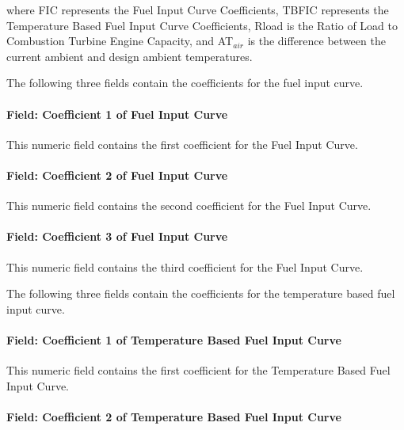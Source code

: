 where FIC represents the Fuel Input Curve Coefficients, TBFIC represents the Temperature Based Fuel Input Curve Coefficients, Rload is the Ratio of Load to Combustion Turbine Engine Capacity, and AT\(_{air}\) is the difference between the current ambient and design ambient temperatures.

The following three fields contain the coefficients for the fuel input curve.

\paragraph{Field: Coefficient 1 of Fuel Input Curve}\label{field-coefficient-1-of-fuel-input-curve}

This numeric field contains the first coefficient for the Fuel Input Curve.

\paragraph{Field: Coefficient 2 of Fuel Input Curve}\label{field-coefficient-2-of-fuel-input-curve}

This numeric field contains the second coefficient for the Fuel Input Curve.

\paragraph{Field: Coefficient 3 of Fuel Input Curve}\label{field-coefficient-3-of-fuel-input-curve}

This numeric field contains the third coefficient for the Fuel Input Curve.

The following three fields contain the coefficients for the temperature based fuel input curve.

\paragraph{Field: Coefficient 1 of Temperature Based Fuel Input Curve}\label{field-coefficient-1-of-temperature-based-fuel-input-curve}

This numeric field contains the first coefficient for the Temperature Based Fuel Input Curve.

\paragraph{Field: Coefficient 2 of Temperature Based Fuel Input Curve}\label{field-coefficient-2-of-temperature-based-fuel-input-curve}

